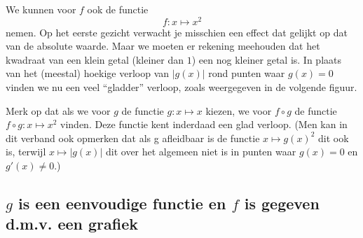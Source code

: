 \documentclass{ximera}
\begin{document}
\newpage

We kunnen voor $f$ ook de functie
\[
f:x\mapsto x^2
\]
nemen. Op het eerste gezicht verwacht je misschien een effect dat
gelijkt op dat van de absolute waarde. Maar we moeten er rekening
meehouden dat het kwadraat van een klein getal (kleiner dan $1$) een
nog kleiner getal is.  In plaats van het (meestal) hoekige verloop van
$|g(x)|$ rond punten waar $g(x)=0$ vinden we nu een veel ``gladder''
verloop, zoals weergegeven in de volgende figuur.

\begin{center}
\end{center}


Merk op dat als we voor $g$ de functie $g:x\mapsto x$ kiezen, we voor
$f\circ g$ de functie $f\circ g:x\mapsto x^2$ vinden. Deze functie
kent inderdaad een glad verloop. (Men kan in dit verband ook opmerken
dat als g afleidbaar is de functie $x\mapsto g(x)^2$ dit ook is, terwijl
$x\mapsto |g(x)|$ dit over het algemeen niet is in punten waar $g(x)=0$ en
$g'(x)\neq 0$.)

\subsection{$g$ is een eenvoudige functie en $f$ is gegeven d.m.v. een grafiek}
\end{document}
